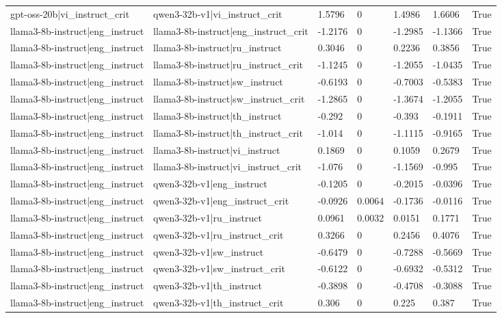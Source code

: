 \begin{table}
\begin{tabular}{llllllr}
gpt-oss-20b|vi_instruct_crit & qwen3-32b-v1|vi_instruct_crit & 1.5796 & 0 & 1.4986 & 1.6606 & True \\
llama3-8b-instruct|eng_instruct & llama3-8b-instruct|eng_instruct_crit & -1.2176 & 0 & -1.2985 & -1.1366 & True \\
llama3-8b-instruct|eng_instruct & llama3-8b-instruct|ru_instruct & 0.3046 & 0 & 0.2236 & 0.3856 & True \\
llama3-8b-instruct|eng_instruct & llama3-8b-instruct|ru_instruct_crit & -1.1245 & 0 & -1.2055 & -1.0435 & True \\
llama3-8b-instruct|eng_instruct & llama3-8b-instruct|sw_instruct & -0.6193 & 0 & -0.7003 & -0.5383 & True \\
llama3-8b-instruct|eng_instruct & llama3-8b-instruct|sw_instruct_crit & -1.2865 & 0 & -1.3674 & -1.2055 & True \\
llama3-8b-instruct|eng_instruct & llama3-8b-instruct|th_instruct & -0.292 & 0 & -0.393 & -0.1911 & True \\
llama3-8b-instruct|eng_instruct & llama3-8b-instruct|th_instruct_crit & -1.014 & 0 & -1.1115 & -0.9165 & True \\
llama3-8b-instruct|eng_instruct & llama3-8b-instruct|vi_instruct & 0.1869 & 0 & 0.1059 & 0.2679 & True \\
llama3-8b-instruct|eng_instruct & llama3-8b-instruct|vi_instruct_crit & -1.076 & 0 & -1.1569 & -0.995 & True \\
llama3-8b-instruct|eng_instruct & qwen3-32b-v1|eng_instruct & -0.1205 & 0 & -0.2015 & -0.0396 & True \\
llama3-8b-instruct|eng_instruct & qwen3-32b-v1|eng_instruct_crit & -0.0926 & 0.0064 & -0.1736 & -0.0116 & True \\
llama3-8b-instruct|eng_instruct & qwen3-32b-v1|ru_instruct & 0.0961 & 0.0032 & 0.0151 & 0.1771 & True \\
llama3-8b-instruct|eng_instruct & qwen3-32b-v1|ru_instruct_crit & 0.3266 & 0 & 0.2456 & 0.4076 & True \\
llama3-8b-instruct|eng_instruct & qwen3-32b-v1|sw_instruct & -0.6479 & 0 & -0.7288 & -0.5669 & True \\
llama3-8b-instruct|eng_instruct & qwen3-32b-v1|sw_instruct_crit & -0.6122 & 0 & -0.6932 & -0.5312 & True \\
llama3-8b-instruct|eng_instruct & qwen3-32b-v1|th_instruct & -0.3898 & 0 & -0.4708 & -0.3088 & True \\
llama3-8b-instruct|eng_instruct & qwen3-32b-v1|th_instruct_crit & 0.306 & 0 & 0.225 & 0.387 & True \\

\end{tabular}
\end{table}
